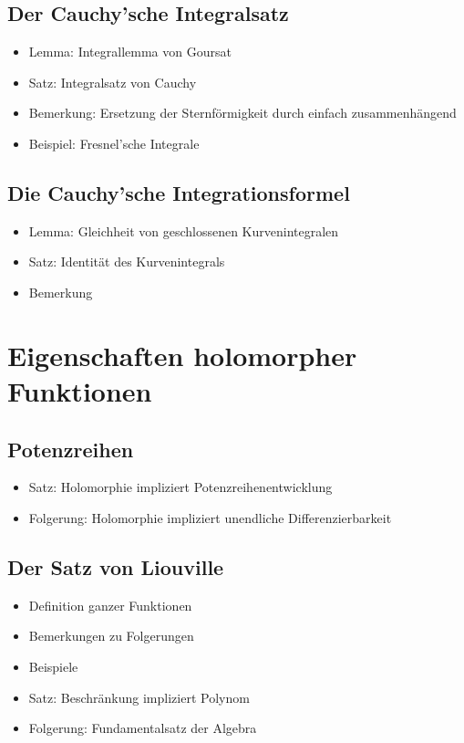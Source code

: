 \documentclass[8pt,a4paper,fleqn]{article}
\begin{document}
\begin{multicols}{2}
  \subsection{Der Cauchy'sche Integralsatz} %
  \label{sub:der_cauchy_sche_integralsatz}
  \begin{itemize}
    \item Lemma: Integrallemma von Goursat
    \item Satz: Integralsatz von Cauchy
    \item Bemerkung: Ersetzung der Sternförmigkeit durch einfach zusammenhängend
    \item Beispiel: Fresnel'sche Integrale
  \end{itemize}

  \subsection{Die Cauchy'sche Integrationsformel} %
  \label{sub:die_cauchy_sche_integrationsformel}
  \begin{itemize}
    \item Lemma: Gleichheit von geschlossenen Kurvenintegralen
    \item Satz: Identität des Kurvenintegrals
    \item Bemerkung
  \end{itemize}

  \section{Eigenschaften holomorpher Funktionen} %
  \label{sec:eigenschaften_holomorpher_funktionen}
  \subsection{Potenzreihen} %
  \label{sub:potenzreihen}
  \begin{itemize}
    \item Satz: Holomorphie impliziert Potenzreihenentwicklung
    \item Folgerung: Holomorphie impliziert unendliche Differenzierbarkeit
  \end{itemize}

  \subsection{Der Satz von Liouville} %
  \label{sub:der_satz_von_liouville}
  \begin{itemize}
    \item Definition ganzer Funktionen
    \item Bemerkungen zu Folgerungen
    \item Beispiele
    \item Satz: Beschränkung impliziert Polynom
    \item Folgerung: Fundamentalsatz der Algebra
  \end{itemize}


\end{multicols}
\end{document}
